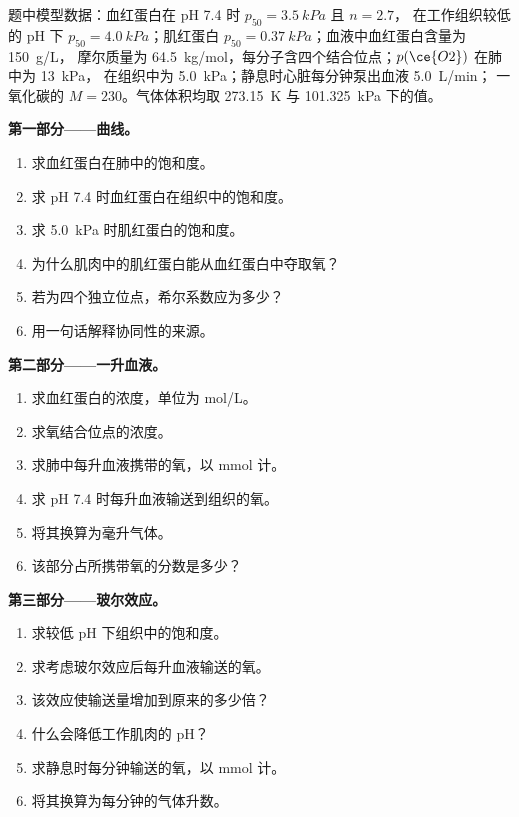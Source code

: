 \begin{problem}
\label{pb:b3:bioinorganic:1}
题中模型数据：血红蛋白在 pH 7.4 时 $p_{50} = \qty{3.5}{kPa}$ 且 $n = 2.7$，
在工作组织较低的 pH 下 $p_{50} = \qty{4.0}{kPa}$；肌红蛋白 $p_{50} = \qty{0.37}{kPa}$；血液中血红蛋白含量为 \qty{150}{g/L}，
摩尔质量为 \qty{64.5}{kg/mol}，每分子含四个结合位点；$p(\ce{O2})$ 在肺中为 \qty{13}{kPa}，
在组织中为 \qty{5.0}{kPa}；静息时心脏每分钟泵出血液 \qty{5.0}{L/min}；
一氧化碳的 $M = 230$。气体体积均取 \qty{273.15}{K} 与 \qty{101.325}{kPa} 下的值。

\medskip\noindent\textbf{第一部分——曲线。}
\begin{enumerate}
  \item 求血红蛋白在肺中的饱和度。
  \item 求 pH 7.4 时血红蛋白在组织中的饱和度。
  \item 求 \qty{5.0}{kPa} 时肌红蛋白的饱和度。
  \item 为什么肌肉中的肌红蛋白能从血红蛋白中夺取氧？
  \item 若为四个独立位点，希尔系数应为多少？
  \item 用一句话解释协同性的来源。
\end{enumerate}

\medskip\noindent\textbf{第二部分——一升血液。}
\begin{enumerate}[resume]
  \item 求血红蛋白的浓度，单位为 mol/L。
  \item 求氧结合位点的浓度。
  \item 求肺中每升血液携带的氧，以 mmol 计。
  \item 求 pH 7.4 时每升血液输送到组织的氧。
  \item 将其换算为毫升气体。
  \item 该部分占所携带氧的分数是多少？
\end{enumerate}

\medskip\noindent\textbf{第三部分——玻尔效应。}
\begin{enumerate}[resume]
  \item 求较低 pH 下组织中的饱和度。
  \item 求考虑玻尔效应后每升血液输送的氧。
  \item 该效应使输送量增加到原来的多少倍？
  \item 什么会降低工作肌肉的 pH？
  \item 求静息时每分钟输送的氧，以 mmol 计。
  \item 将其换算为每分钟的气体升数。
\end{enumerate}


\end{problem}
